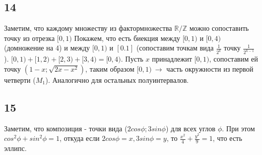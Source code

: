 		\subsection{14}
		Заметим, что каждому множеству из фактормножества $\mathbb{R}/\mathbb{Z}$ можно сопоставить точку из отрезка $[0,1)$ Покажем, что есть биекция между $[0,1)$ и $[0,4)$ (домножение на 4) и между $[0,1)$ и $[0.1]$ (сопоставим точкам вида $\frac{1}{2^k}$ точку $\frac{1}{2^{k-1}}$). $[0,1) + [1,2) + [2,3) + [3,4) = [0,4)$. Пусть $x$ принадлежит $[0,1)$, сопоставим ей точку $(1 - x; \sqrt{2x - x^2})$, таким образом $[0,1) \ \to$ часть окружности из первой четверти ($M_1$). Аналогично для остальных полуинтервалов.
		
		\subsection{15}
		Заметим, что композиция - точки вида ($2 cos \phi; 3 sin \phi$) для всех углов $\phi$. При этом $cos^2 \phi + sin^2 \phi = 1$, откуда если $2 cos \phi = x, 3 sin \phi = y$, то $\frac{x^2}{4} + \frac{y^2}{9} = 1$, что есть эллипс.
		
